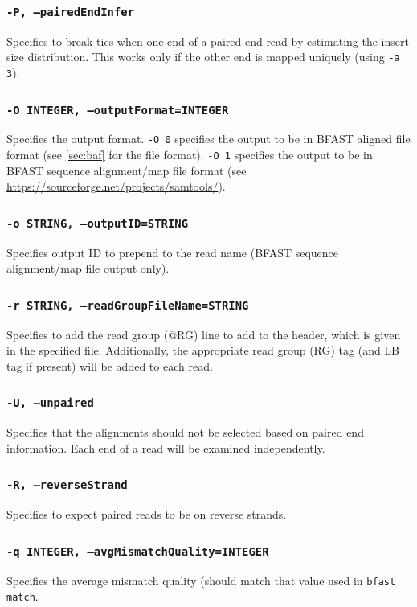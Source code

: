 \documentclass[a4paper,12pt]{book}
\newcommand{\TT}[1]{{\tt #1}} %
\newcommand{\BAF}{BFAST aligned file} %
\newcommand{\BSAMF}{BFAST sequence alignment/map file} %
\begin{document}
\subsubsection{\TT{-P, --pairedEndInfer}}
Specifies to break ties when one end of a paired end read by estimating the insert size distribution.  
This works only if the other end is mapped uniquely (using \TT{-a 3}).
\subsubsection{\TT{-O INTEGER, --outputFormat=INTEGER}}
Specifies the output format.
\TT{-O 0} specifies the output to be in \BAF{} format (see \autoref{sec:baf} for the file format).
\TT{-O 1} specifies the output to be in \BSAMF{} format (see \url{https://sourceforge.net/projects/samtools/}).

\subsubsection{\TT{-o STRING, --outputID=STRING}}
Specifies output ID to prepend to the read name (\BSAMF{} output only).
\subsubsection{\TT{-r STRING, --readGroupFileName=STRING}}
Specifies to add the read group (@RG) line to add to the header, which is given in the specified file.
Additionally, the appropriate read group (RG) tag (and LB tag if present) will be added to each read.
\subsubsection{\tt{-U, --unpaired}}
Specifies that the alignments should not be selected based on paired end information.
Each end of a read will be examined independently.

\subsubsection{\tt{-R, --reverseStrand}}
Specifies to expect paired reads to be on reverse strands.

\subsubsection{\TT{-q INTEGER, --avgMismatchQuality=INTEGER}}
Specifies the average mismatch quality (should match that value used in \TT{bfast match}.
\end{document}
